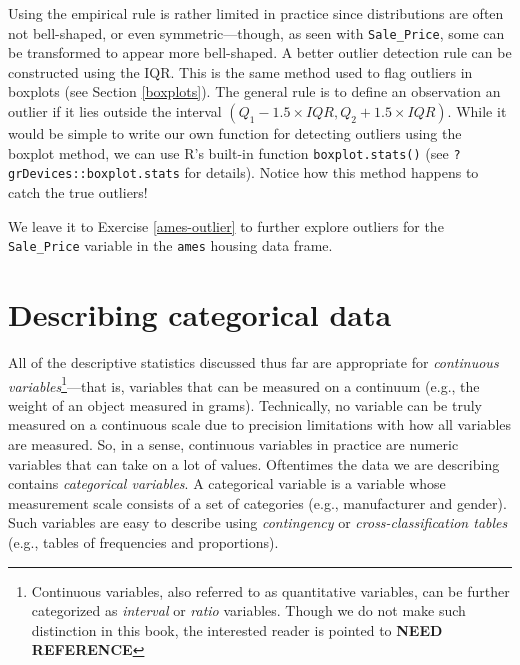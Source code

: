 \documentclass[]{book}
\newenvironment{Shaded}{\begin{snugshade}}{\end{snugshade}}
\newcommand{\KeywordTok}[1]{\textcolor[rgb]{0.13,0.29,0.53}{\textbf{#1}}}
\newcommand{\NormalTok}[1]{#1}
\newcommand{\OperatorTok}[1]{\textcolor[rgb]{0.81,0.36,0.00}{\textbf{#1}}}
\let\rmarkdownfootnote\footnote%
\def\footnote{\protect\rmarkdownfootnote}
\theoremstyle{definition}
\theoremstyle{definition}
\theoremstyle{definition}
\theoremstyle{remark}
\begin{document}
Using the empirical rule is rather limited in practice since
distributions are often not bell-shaped, or even symmetric---though, as
seen with \texttt{Sale\_Price}, some can be transformed to appear more
bell-shaped. A better outlier detection rule can be constructed using
the IQR. This is the same method used to flag outliers in boxplots (see
Section \ref{boxplots}). The general rule is to define an observation an
outlier if it lies outside the interval
\(\left(Q_1 - 1.5 \times IQR, Q_2 + 1.5 \times IQR\right)\). While it
would be simple to write our own function for detecting outliers using
the boxplot method, we can use R's built-in function
\texttt{boxplot.stats()} (see \texttt{?grDevices::boxplot.stats} for
details). Notice how this method happens to catch the true outliers!

\begin{Shaded}
\end{Shaded}

We leave it to Exercise \ref{ames-outlier} to further explore outliers
for the \texttt{Sale\_Price} variable in the \texttt{ames} housing data
frame.

\hypertarget{categorical}{%
\section{Describing categorical data}\label{categorical}}

All of the descriptive statistics discussed thus far are appropriate for
\emph{continuous variables}\footnote{Continuous variables, also referred
  to as quantitative variables, can be further categorized as
  \emph{interval} or \emph{ratio} variables. Though we do not make such
  distinction in this book, the interested reader is pointed to
  \textbf{NEED REFERENCE}}---that is, variables that can be measured on
a continuum (e.g., the weight of an object measured in grams).
Technically, no variable can be truly measured on a continuous scale due
to precision limitations with how all variables are measured. So, in a
sense, continuous variables in practice are numeric variables that can
take on a lot of values. Oftentimes the data we are describing contains
\emph{categorical variables}. A categorical variable is a variable whose
measurement scale consists of a set of categories (e.g., manufacturer
and gender). Such variables are easy to describe using
\emph{contingency} or \emph{cross-classification tables} (e.g., tables
of frequencies and proportions).
\end{document}

